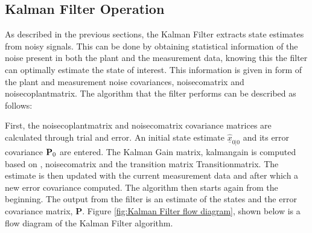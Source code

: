 \subsection{Kalman Filter Operation}

As described in the previous sections, the Kalman Filter extracts state estimates from noisy signals. This can be done by obtaining statistical information of the noise present in both the plant and the measurement data, knowing this the filter can optimally estimate the state of interest. This information is given in form of the plant and measurement noise covariances, \gls{noisecomatrix} and \gls{noisecoplantmatrix}. The algorithm that the filter performs can be described as follows:


First, the \gls{noisecoplantmatrix} and \gls{noisecomatrix} covariance matrices are calculated through trial and error. An initial state estimate $\hat{\underline{x}}_{0|0}$ and its error covariance $\text{\bf P}_0$ are entered. The Kalman Gain matrix, \gls{kalmangain} is computed based on , \gls{noisecomatrix} and the transition matrix \gls{Transitionmatrix}. The estimate is then updated with the current measurement data and after which a new error covariance computed. The algorithm then starts again from the beginning. The output from the filter is an estimate of the states and the error covariance matrix, {\bf P}. Figure \ref{fig:Kalman Filter flow diagram}, shown below is a flow diagram of the Kalman Filter algorithm.   


